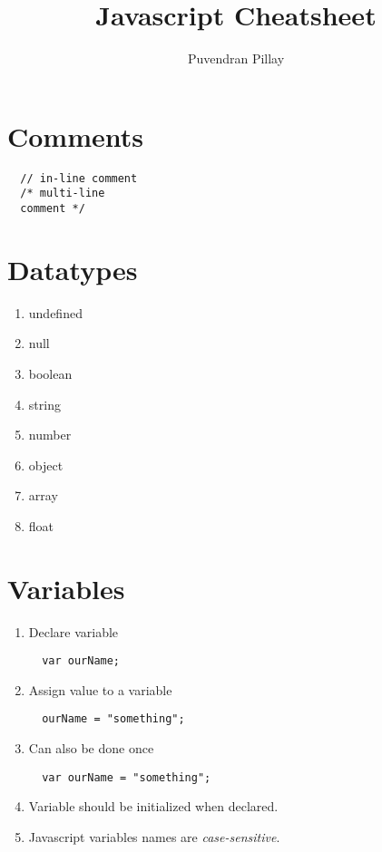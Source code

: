 \documentclass{article}
\title{Javascript Cheatsheet}
\author{Puvendran Pillay}
\begin{document}
\maketitle
\section{Comments}
\begin{lstlisting}
  // in-line comment
  /* multi-line
  comment */
\end{lstlisting}
\section{Datatypes}
\begin{enumerate}
\item undefined
\item  null
\item  boolean
\item  string
\item  number
\item  object
\item  array
\item  float
\end{enumerate}
\section{Variables}
\begin{enumerate}
\item Declare variable
\begin{lstlisting}
  var ourName;
\end{lstlisting}
\item Assign value to a variable
\begin{lstlisting}
  ourName = "something";
\end{lstlisting}
\item Can also be done once
\begin{lstlisting}
  var ourName = "something";
\end{lstlisting}
\item Variable should be initialized when declared.
\item Javascript variables names are \emph{case-sensitive}.
\end{enumerate}
\end{document}
